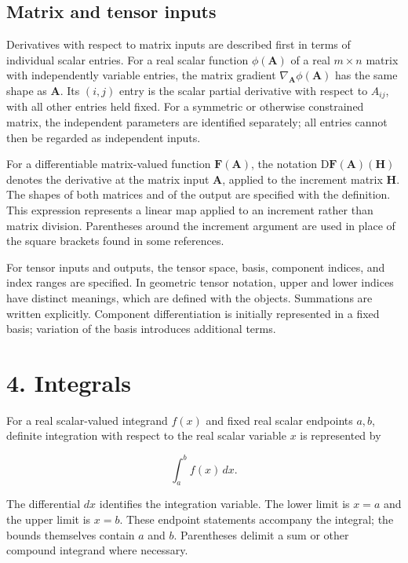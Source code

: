\documentclass[11pt,oneside,openany]{book}
\begin{document}
\subsection{Matrix and tensor inputs}

Derivatives with respect to matrix inputs are described first in terms of
individual scalar entries. For a real scalar function \(\phi(\mathbf A)\) of
a real \(m\times n\) matrix with independently variable entries, the matrix
gradient \(\nabla_{\mathbf A}\phi(\mathbf A)\) has the same shape as
\(\mathbf A\). Its \((i,j)\) entry is the scalar partial derivative with
respect to \(A_{ij}\), with all other entries held fixed. For a symmetric or
otherwise constrained matrix, the independent parameters are identified
separately; all entries cannot then be regarded as independent inputs.

For a differentiable matrix-valued function \(\mathbf F(\mathbf A)\), the
notation \(\mathrm D\mathbf F(\mathbf A)(\mathbf H)\) denotes the derivative
at the matrix input \(\mathbf A\), applied to the increment matrix
\(\mathbf H\). The shapes of both matrices and of the output are specified
with the definition. This expression represents a linear map applied to
an increment rather than matrix division. Parentheses around the
increment argument are used in place of the square brackets found in
some references.

For tensor inputs and outputs, the tensor space, basis, component indices,
and index ranges are specified. In geometric tensor notation, upper and
lower indices have distinct meanings, which are defined with the objects.
Summations are written explicitly. Component differentiation is initially
represented in a fixed basis; variation of the basis introduces additional
terms.
\clearpage

\section{4. Integrals}

For a real scalar-valued integrand \(f(x)\) and fixed real scalar endpoints
\(a,b\), definite integration with respect to the real scalar variable \(x\)
is represented by

\[
\int_a^b f(x)\,dx.
\]

The differential \(dx\) identifies the integration variable. The lower
limit is \(x=a\) and the upper limit is \(x=b\). These endpoint statements
accompany the integral; the bounds themselves contain \(a\) and \(b\).
Parentheses delimit a sum or other compound integrand where necessary.
\end{document}
